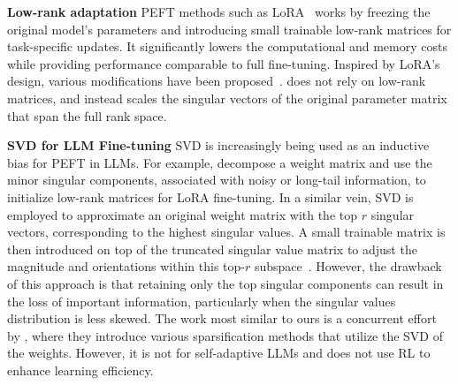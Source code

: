 \textbf{Low-rank adaptation}
PEFT methods such as LoRA~\citep{hu2021lora} works by freezing the original model's parameters and introducing small trainable low-rank matrices for task-specific updates.
It significantly lowers the computational and memory costs while providing performance comparable to full fine-tuning.
Inspired by LoRA's design, various modifications have been proposed~\citep{zhang2023adalora,kopiczko2023vera,liu2024dora,balazy2024lora,huggingface2023svdtraining}.
\implname does not rely on low-rank matrices, and instead scales the singular vectors of the original parameter matrix that span the full rank space.

\textbf{SVD for LLM Fine-tuning}
SVD is increasingly being used as an inductive bias for PEFT in LLMs.
For example, \citet{wang2024milora} decompose a weight matrix and use the minor singular components, associated with noisy or long-tail information, to initialize low-rank matrices for LoRA fine-tuning.
In a similar vein, SVD is employed to approximate an original weight matrix with the top $r$ singular vectors, corresponding to the highest singular values.
A small trainable matrix is then introduced on top of the truncated singular value matrix to adjust the magnitude and orientations within this top-$r$ subspace~\citep{balazy2024lora,huggingface2023svdtraining}.
However, the drawback of this approach is that retaining only the top singular components can result in the loss of important information, particularly when the singular values distribution is less skewed.
The work most similar to ours is a concurrent effort by \citet{lingam2024svft}, where they introduce various sparsification methods that utilize the SVD of the weights.
However, it is not for self-adaptive LLMs and does not use RL to enhance learning efficiency.